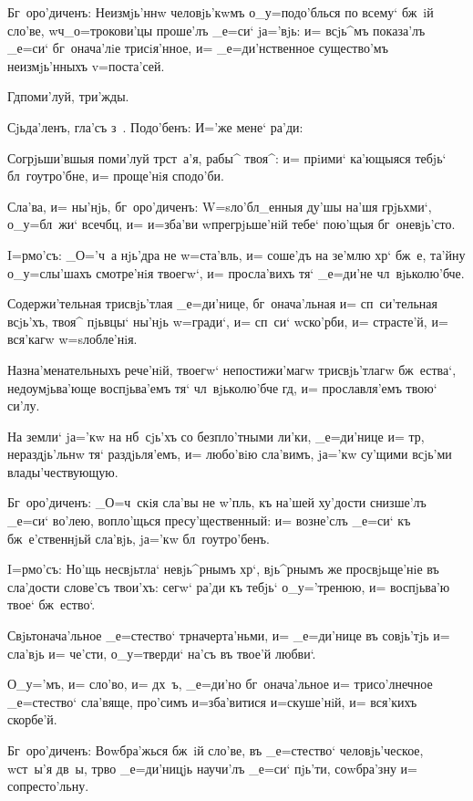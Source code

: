 Бг~оро'диченъ: Неизмjь'ннw человjь'кwмъ о_у=подо'блься 
по всему` бж~iй сло'ве, w\т ч _о=трокови'цы проше'лъ 
_е=си` jа='вjь: и= всjь^мъ показа'лъ _е=си` бг~онача'лiе 
трисiя'нное, и= _е=ди'нственное существо'мъ неизмjь'нныхъ 
v=поста'сей.

Гд поми'луй, три'жды.

Сjьда'ленъ, гла'съ з~. Подо'бенъ: И='же мене` ра'ди:

Согрjьши'вшыя поми'луй тр ст~а'я, рабы^ твоя^: и= 
прiими` ка'ющыяся тебjь` бл~гоутро'бне, и= проще'нiя 
сподо'би.

Сла'ва, и= ны'нjь, бг~оро'диченъ: W=sло'бл_енныя ду'шы 
на'шя грjьхми`, о_у=бл~жи` всеч бц, и= и=зба'ви 
w\т прегрjьше'нiй тебе` пою'щыя бг~оневjь'сто.


I=рмо'съ: _О='ч~а нjь'дра не w=ста'вль, и= соше'дъ на 
зе'млю хр` бж~е, та'йну о_у=слы'шахъ смотре'нiя 
твоегw`, и= просла'вихъ тя` _е=ди'не чл~вjьколю'бче.

Содержи'тельная трисвjь'тлая _е=ди'нице, 
бг~онача'льная и= сп~си'тельная всjь'хъ, твоя^ пjьвцы` 
ны'нjь w=гради`, и= сп~си` w\т ско'рби, и= страсте'й, и= 
вся'кагw w=sлобле'нiя.

Назна'менательныхъ рече'нiй, твоегw` непостижи'магw 
трисвjь'тлагw бж~ества`, недоумjьва'юще воспjьва'емъ тя` 
чл~вjьколю'бче гд, и= прославля'емъ твою` си'лу.

На земли` jа='кw на нб~сjь'хъ со безпло'тными ли'ки, 
_е=ди'нице и= тр, нераздjь'льнw тя` раздjьля'емъ, и= 
любо'вiю сла'вимъ, jа='кw су'щими всjь'ми 
влады'чествующую.

Бг~оро'диченъ: _О=ч~скiя сла'вы не w'пль, къ 
на'шей ху'дости снизше'лъ _е=си` во'лею, вопло'щься 
пресу'щественный: и= возне'слъ _е=си` къ бж~е'ственнjьй 
сла'вjь, jа='кw бл~гоутро'бенъ.


I=рмо'съ: Но'щь несвjьтла` невjь^рнымъ хр`, 
вjь^рнымъ же просвjьще'нiе въ сла'дости слове'съ твои'хъ: 
сегw` ра'ди къ тебjь` о_у='тренюю, и= воспjьва'ю твое` 
бж~ество`.

Свjьтонача'льное _е=стество` тр начерта'ньми, и= 
_е=ди'нице въ совjь'тjь и= сла'вjь и= че'сти, о_у=тверди` 
на'съ въ твое'й любви`.

О_у='мъ, и= сло'во, и= дх~ъ, _е=ди'но бг~онача'льное 
и= трисо'лнечное _е=стество` сла'вяще, про'симъ 
и=зба'витися и=скуше'нiй, и= вся'кихъ скорбе'й.

Бг~оро'диченъ: Воwбра'жься бж~iй сло'ве, въ 
_е=стество` человjь'ческое, w\т ст~ы'я дв~ы, тр во 
_е=ди'ницjь научи'лъ _е=си` пjь'ти, соwбра'зну и= 
сопресто'льну.

